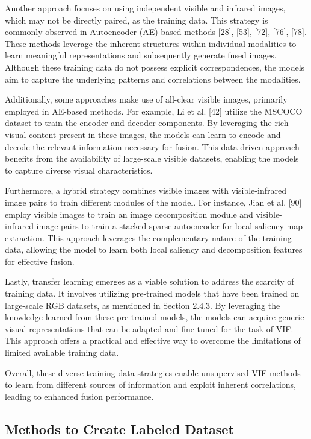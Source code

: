 Another approach focuses on using independent visible and infrared images, which may not be directly paired, as the training data. This strategy is commonly observed in Autoencoder (AE)-based methods [28], [53], [72], [76], [78]. These methods leverage the inherent structures within individual modalities to learn meaningful representations and subsequently generate fused images. Although these training data do not possess explicit correspondences, the models aim to capture the underlying patterns and correlations between the modalities.

Additionally, some approaches make use of all-clear visible images, primarily employed in AE-based methods. For example, Li et al. [42] utilize the MSCOCO dataset to train the encoder and decoder components. By leveraging the rich visual content present in these images, the models can learn to encode and decode the relevant information necessary for fusion. This data-driven approach benefits from the availability of large-scale visible datasets, enabling the models to capture diverse visual characteristics.

Furthermore, a hybrid strategy combines visible images with visible-infrared image pairs to train different modules of the model. For instance, Jian et al. [90] employ visible images to train an image decomposition module and visible-infrared image pairs to train a stacked sparse autoencoder for local saliency map extraction. This approach leverages the complementary nature of the training data, allowing the model to learn both local saliency and decomposition features for effective fusion.

Lastly, transfer learning emerges as a viable solution to address the scarcity of training data. It involves utilizing pre-trained models that have been trained on large-scale RGB datasets, as mentioned in Section 2.4.3. By leveraging the knowledge learned from these pre-trained models, the models can acquire generic visual representations that can be adapted and fine-tuned for the task of VIF. This approach offers a practical and effective way to overcome the limitations of limited available training data.

Overall, these diverse training data strategies enable unsupervised VIF methods to learn from different sources of information and exploit inherent correlations, leading to enhanced fusion performance.

\subsection{Methods to Create Labeled Dataset}

